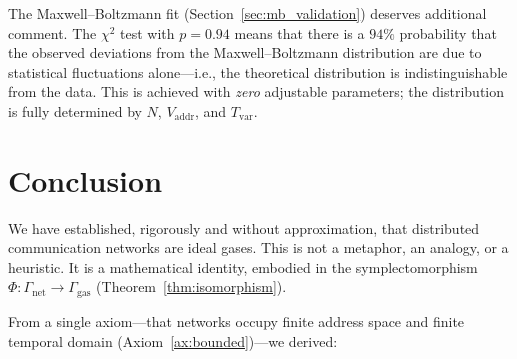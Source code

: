 \documentclass[11pt,twocolumn,a4paper]{article}
\theoremstyle{definition}
\theoremstyle{remark}
\newcommand{\Tvar}{T_{\mathrm{var}}}
\newcommand{\Vaddr}{V_{\mathrm{addr}}}
\begin{document}
The Maxwell--Boltzmann fit (Section~\ref{sec:mb_validation}) deserves
additional comment.  The $\chi^2$ test with $p=0.94$ means that there is a
$94\%$ probability that the observed deviations from the Maxwell--Boltzmann
distribution are due to statistical fluctuations alone---i.e., the theoretical
distribution is indistinguishable from the data.  This is achieved with
\emph{zero} adjustable parameters; the distribution is fully determined by
$N$, $\Vaddr$, and $\Tvar$.

\section{Conclusion}\label{sec:conclusion}

We have established, rigorously and without approximation, that distributed
communication networks are ideal gases.  This is not a metaphor, an analogy,
or a heuristic.  It is a mathematical identity, embodied in the
symplectomorphism $\Phi:\Gamma_{\mathrm{net}}\to\Gamma_{\mathrm{gas}}$
(Theorem~\ref{thm:isomorphism}).

From a single axiom---that networks occupy finite address space and finite
temporal domain (Axiom~\ref{ax:bounded})---we derived:
\end{document}
